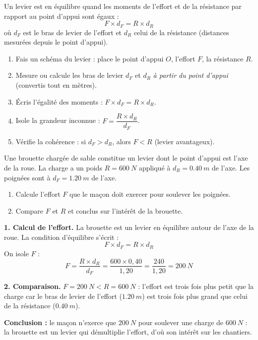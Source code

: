 \documentclass[11pt]{article}
\begin{document}
\begin{methode}
Un levier est en équilibre quand les moments de l'effort et de la résistance par rapport au point d'appui sont égaux :
\[ F \times d_F = R \times d_R \]
où $d_F$ est le bras de levier de l'effort et $d_R$ celui de la résistance (distances mesurées depuis le point d'appui).
\begin{enumerate}
\item Fais un schéma du levier : place le point d'appui $O$, l'effort $F$, la résistance $R$.
\item Mesure ou calcule les bras de levier $d_F$ et $d_R$ \emph{à partir du point d'appui} (convertis tout en mètres).
\item Écris l'égalité des moments : $F \times d_F = R \times d_R$.
\item Isole la grandeur inconnue : $F = \dfrac{R \times d_R}{d_F}$.
\item Vérifie la cohérence : si $d_F > d_R$, alors $F < R$ (levier avantageux).
\end{enumerate}
\end{methode}

\begin{exoresolu}
Une brouette chargée de sable constitue un levier dont le point d'appui est l'axe de la roue. La charge a un poids $R = \SI{600}{N}$ appliqué à $d_R = \SI{0,40}{m}$ de l'axe. Les poignées sont à $d_F = \SI{1,20}{m}$ de l'axe.
\begin{enumerate}
\item Calcule l'effort $F$ que le maçon doit exercer pour soulever les poignées.
\item Compare $F$ et $R$ et conclus sur l'intérêt de la brouette.
\end{enumerate}
\tcblower
\textbf{1. Calcul de l'effort.} La brouette est un levier en équilibre autour de l'axe de la roue. La condition d'équilibre s'écrit :
\[ F \times d_F = R \times d_R \]
On isole $F$ :
\[ F = \frac{R \times d_R}{d_F} = \frac{600 \times 0{,}40}{1{,}20} = \frac{240}{1{,}20} = \SI{200}{N} \]

\textbf{2. Comparaison.} $F = \SI{200}{N} < R = \SI{600}{N}$ : l'effort est trois fois plus petit que la charge car le bras de levier de l'effort ($\SI{1,20}{m}$) est trois fois plus grand que celui de la résistance ($\SI{0,40}{m}$).

\textbf{Conclusion :} le maçon n'exerce que $\SI{200}{N}$ pour soulever une charge de $\SI{600}{N}$ : la brouette est un levier qui démultiplie l'effort, d'où son intérêt sur les chantiers.
\end{exoresolu}
\end{document}
